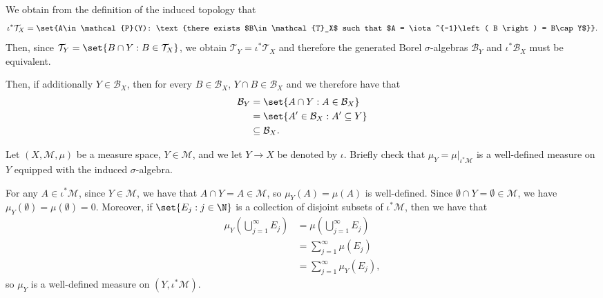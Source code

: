 \documentclass[10pt]{mypackage}
\begin{document}
\begin{solution}
  We obtain from the definition of the induced topology that 
  \begin{align*}
    \iota^{\ast}\mathcal{T}_X=\set{A\in\mathcal{P}(Y): \text{there exists $B\in \mathcal{T}_X$ such that $A = \iota^{-1}\left( B \right) = B\cap Y$}}.
  \end{align*}
  Then, since $\mathcal{T}_Y=\set{B\cap Y: B\in\mathcal{T}_X}$, we obtain $\mathcal{T}_Y=\iota^{\ast}\mathcal{T}_X$ and therefore the generated Borel $\sigma$-algebras $\mathcal{B}_Y$ and $\iota^{\ast}\mathcal{B}_X$ must be equivalent.

Then, if additionally $Y\in\mathcal{B}_X$, then for every $B\in\mathcal{B}_X$, $Y\cap B\in\mathcal{B}_X$ and we therefore have that 
\begin{align*}
  \mathcal{B}_Y&=\set{A\cap Y: A\in\mathcal{B}_X}\\
               &=\set{A'\in\mathcal{B}_X:A'\subseteq Y}\\
               &\subseteq\mathcal{B}_X.
\end{align*}
\end{solution}
\begin{problem}
  Let $\left( X,\mathcal{M},\mu \right)$ be a measure space, $Y\in \mathcal{M}$, and we let $Y\to X$ be denoted by $\iota$. Briefly check that $\mu_Y = \mu|_{\iota^{\ast}\mathcal{M}}$ is a well-defined measure on $Y$ equipped with the induced $\sigma$-algebra.
\end{problem}
\begin{solution}
  For any $A\in \iota^{\ast}\mathcal{M}$, since $Y\in \mathcal{M}$, we have that $A\cap Y = A\in \mathcal{M}$, so $\mu_Y(A) = \mu(A)$ is well-defined. Since $\emptyset\cap Y = \emptyset\in \mathcal{M}$, we have $\mu_Y\left( \emptyset \right) = \mu(\emptyset) = 0$. Moreover, if $\set{E_j : j\in \N}$ is a collection of disjoint subsets of $\iota^{\ast}\mathcal{M}$, then we have that
  \begin{align*}
    \mu_Y\left( \bigcup_{j=1}^{\infty}E_j \right) &= \mu\left( \bigcup_{j=1}^{\infty}E_j \right)\\
                                                  &= \sum_{j=1}^{\infty}\mu\left( E_j \right)\\
                                                  &= \sum_{j=1}^{\infty}\mu_Y\left( E_j \right),
  \end{align*}
  so $\mu_Y$ is a well-defined measure on $\left( Y,\iota^{\ast}\mathcal{M} \right)$.
\end{solution}
\end{document}
